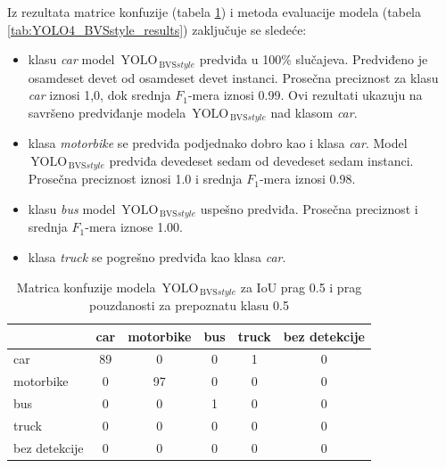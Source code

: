 \documentclass[12pt,oneside]{memoir}
\newcommand{\yolo}{\ensuremath{\,\textrm{YOLO}}}
\newcommand{\bvs}{\ensuremath{\,\textrm{BVS}}}
\begin{document}
Iz rezultata matrice konfuzije (tabela \ref{tab:YOLO4_BVSstyle_confusion_mat}) i metoda evaluacije modela (tabela \ref{tab:YOLO4_BVSstyle_results}) zaključuje se sledeće:
\begin{itemize}
    \item klasu \textit{car} model $\yolo_{\bvs{style}}$ predviđa u 100\% slučajeva. Predviđeno je osamdeset devet od osamdeset devet instanci. Prosečna preciznost za klasu \textit{car} iznosi 1,0, dok srednja $F_1$-mera iznosi 0.99. Ovi rezultati ukazuju na savršeno predviđanje modela $\yolo_{\bvs{style}}$ nad klasom \textit{car}.
    \item klasa \textit{motorbike} se predviđa podjednako dobro kao i  klasa \textit{car}. Model $\yolo_{\bvs{style}}$ predviđa devedeset sedam od devedeset sedam instanci. Prosečna preciznost iznosi 1.0 i srednja $F_1$-mera iznosi 0.98.
    \item klasu \textit{bus} model $\yolo_{\bvs{style}}$ uspešno predviđa. Prosečna preciznost i srednja $F_1$-mera iznose 1.00.
    \item klasa \textit{truck} se pogrešno predviđa kao klasa \textit{car}. 
\end{itemize}



\begin{table}
    \begin{center}
    \caption{Matrica konfuzije modela $\yolo_{\bvs{style}}$ za IoU prag 0.5 i prag pouzdanosti za prepoznatu klasu 0.5 }
    \begin{tabular}{ l|c|c|c|c|c|}
                  & car  & motorbike & bus & truck & bez detekcije \\ \hline
    car           & 89   & 0         & 0   & 1     & 0             \\ 
    motorbike     & 0    & 97        & 0   & 0     & 0             \\ 
    bus           & 0    & 0         & 1   & 0     & 0             \\ 
    truck         & 0    & 0         & 0   & 0     & 0             \\ 
    bez detekcije & 0    & 0         & 0   & 0     & 0             \\ \hline
    \hline
    \end{tabular}
    \label{tab:YOLO4_BVSstyle_confusion_mat}
    \end{center}
\end{table}
\end{document}
